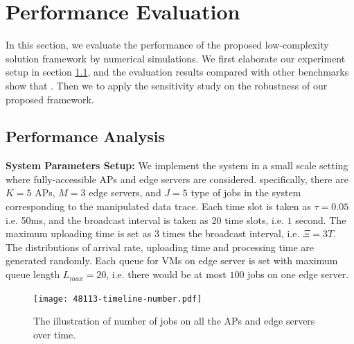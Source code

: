 \section{Performance Evaluation}
\label{sec:evaluation}
In this section, we evaluate the performance of the proposed low-complexity solution framework by numerical simulations.
We first elaborate our experiment setup in section \ref{subsec:basic}, and the evaluation results compared with other benchmarks show that .
Then we  to apply the sensitivity study on the robustness of our proposed framework.

\subsection{Performance Analysis}
\label{subsec:basic}
\textbf{System Parameters Setup:}
We implement the system in a small scale setting where fully-accessible APs and edge servers are considered.
specifically, there are $K=5$ APs, $M=3$ edge servers, and $J=5$ type of jobs in the system corresponding to the manipulated data trace.
Each time slot is taken as $\tau = 0.05$ i.e. 50ms, and the broadcast interval is taken as $20$ time slots, i.e. $1$ second.
The maximum uploading time is set as $3$ times the broadcast interval, i.e. $\Xi = 3T$.
The distributions of arrival rate, uploading time and processing time are generated randomly.
Each queue for VMs on edge server is set with maximum queue length $L_{max}=20$, i.e. there would be at most $100$ jobs on one edge server.

\begin{figure}[ht!]
    \centering
    \texttt{[image: 48113-timeline-number.pdf]}
    \caption{The illustration of number of jobs on all the APs and edge servers over time.}
    \label{fig:general_timeline}
\end{figure}

